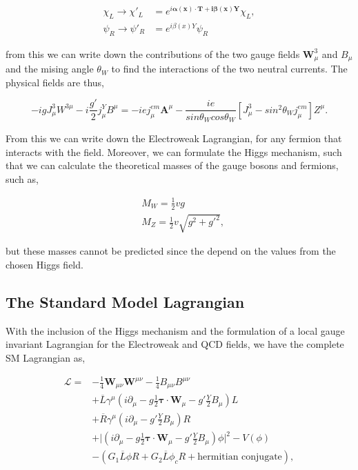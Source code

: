 \begin{equation}
\begin{split}
\chi_L\rightarrow\chi'_L&=e^{i\boldsymbol{\alpha(x)\cdot T+i\beta(x)Y}}\chi_L, \\
\psi_R\rightarrow\psi'_R&=e^{i\beta(x)Y}\psi_R
\end{split}
\end{equation}

from this we can write down the contributions of the two gauge fields $\boldsymbol{W}_\mu^3$ and $B_\mu$ and the mising angle $\theta_W$ to find the interactions of the two neutral currents. The physical fields are thus,

\begin{equation}
-igJ_\mu^3W^{3\mu}-i\frac{g'}{2}j_\mu^YB^\mu=-iej_\mu^{em}\boldsymbol{A}^\mu-\frac{ie}{sin\theta_Wcos\theta_W}[J_\mu^3-sin^2\theta_Wj_\mu^{em}]Z^\mu.
\end{equation}

From this we can write down the Electroweak Lagrangian, for any fermion that interacts with the field. Moreover, we can formulate the Higgs mechanism, such that we can calculate the theoretical masses of the gauge bosons and fermions, such as, 

\begin{equation}
\begin{split}
& M_W=\frac{1}{2}vg \\
& M_Z=\frac{1}{2}v\sqrt{g^2+g'^2},
\end{split}
\end{equation}

but these masses cannot be predicted since the depend on the values from the chosen Higgs field. 

\subsection{The Standard Model Lagrangian}

With the inclusion of the Higgs mechanism and the formulation of a local gauge invariant Lagrangian for the Electroweak and QCD fields, we have the complete SM Lagrangian as,

\begin{equation}\label{SMLagrangian}
\begin{split}
\mathcal{L}=&-\frac{1}{4}\boldsymbol{W}_{\mu\nu}\boldsymbol{W}^{\mu\nu}-\frac{1}{4}B_{\mu\nu}B^{\mu\nu} \\
&+\overline{L}\gamma^\mu(i\partial_\mu-g\frac{1}{2}\boldsymbol{\tau}\cdot\boldsymbol{W}_\mu-g'\frac{Y}{2}B_\mu)L \\
&+\overline{R}\gamma^\mu(i\partial_\mu-g'\frac{Y}{2}B_\mu)R \\
&+\lvert(i\partial_\mu-g\frac{1}{2}\boldsymbol{\tau}\cdot\boldsymbol{W}_\mu-g'\frac{Y}{2}B_\mu)\phi\lvert^2-V(\phi) \\
&-(G_1\overline{L}\phi R+G_2\overline{L}\phi_cR+\text{hermitian conjugate}),
\end{split}
\end{equation}

